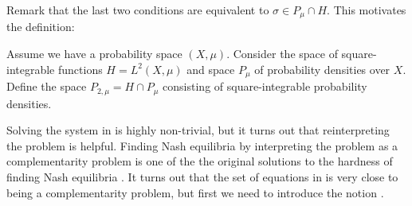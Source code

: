 \begin{comment}
\begin{equation}
      \label{eq:KKT_total}
  \begin{split}
  \begin{pmatrix}
    \nabla_{\sigma_1} U_1 \mid{\sigma_1 = \overbar{\sigma}_1} \\
    \vdots \\
    \nabla_{\sigma_N} U_N \mid{\sigma_N = \overbar{\sigma}_N}
\end{pmatrix} + \begin{pmatrix}
    \mu_1 \\
    \vdots \\
    \mu_N
\end{pmatrix} + \begin{pmatrix}
    \lambda_1 \cdot 1_k \\
    \vdots \\
    \lambda_N \cdot 1_k
\end{pmatrix} = 0 \\
\ip{
\begin{pmatrix}
  \mu_1 \\
  \vdots \\
  \mu_N
\end{pmatrix}}{ \begin{pmatrix}
  \sigma_1 \\
  \vdots \\
  \sigma_N
\end{pmatrix}} = 0 \\
\mu_i \in H_+ \\
  \sigma_i \in H_+ \\
  \int \sigma_i d\mu = 1
  \end{split}
\end{equation}
\end{comment}
Remark that the last two conditions are equivalent to $\sigma \in P_{\mu} \cap H$. This motivates the definition:
\begin{definition}
  Assume we have a probability space $(X,\mu)$. Consider the space of square-integrable functions $H=L^2(X,\mu)$ and space $P_{\mu}$ of probability densities over $X$. Define the space $P_{2,\mu}=H \cap P_{\mu}$ consisting of square-integrable probability densities.
\end{definition}
Solving the system in  is highly non-trivial, but it turns out that reinterpreting the problem is helpful.
Finding Nash equilibria by interpreting the problem as a complementarity problem is one of the the original solutions to the hardness of finding Nash equilibria  \citep{karamardian1969nonlinear}. It turns out that the set of equations in  is very close to being a complementarity problem, but first we need to introduce the notion \citep[p. 507]{hadjisavvas2006handbook}.
